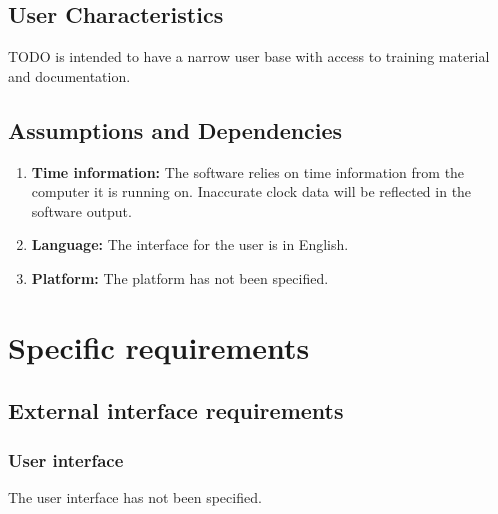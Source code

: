 \documentclass[12pt,a4paper]{article}
\begin{document}

\subsection{User Characteristics}
TODO is intended to have a narrow user base with access to training material and documentation. 


\subsection{Assumptions and Dependencies}
\begin{enumerate}
\item \textbf{Time information:} The software relies on time information from the computer it is running on. Inaccurate clock data will be reflected in the software output. 
\item \textbf{Language:} The interface for the user is in English.
\item \textbf{Platform:} The platform has not been specified.
\end{enumerate}

\section{Specific requirements}

\subsection{External interface requirements}
\subsubsection{User interface}
The user interface has not been specified.
\end{document}

